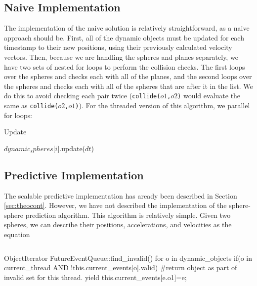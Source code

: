 \documentclass[conference]{IEEEtran}
\begin{document}
\subsection{Naive Implementation}

The implementation of the naive solution is relatively straightforward, as a naive approach should be.  First, all of the dynamic objects must be updated for each timestamp to their new positions, using their previously calculated velocity vectors.  Then, because we are handling the spheres and planes separately, we have two sets of nested for loops to perform the collision checks.  The first loops over the spheres and checks each with all of the planes, and the second loops over the spheres and checks each with all of the spheres that are after it in the list.  We do this to avoid checking each pair twice (\texttt{collide($o1$,$o2$)} would evaluate the same as \texttt{collide($o2$,$o1$)}). For the threaded version of this algorithm, we parallel for loops:

\begin{algorithm}
\caption{Update}
\begin{algorithmic}
	\STATE $dynamic_spheres$[$i$].update($dt$)
\ENDFOR
\end{algorithmic}
\end{algorithm}

\subsection{Predictive Implementation}

The scalable predictive implementation has aready been described in Section \ref{sec:theocont}.  However, we have not described the implementation of the sphere-sphere prediction algorithm.
This algorithm is relatively simple.  Given two spheres, we can describe their positions, accelerations, and velocities as the equation

\begin{equation}
\end{equation}
   
\begin{verbatimtab}[3]
ObjectIterator FutureEventQueue::find_invalid()
{
   for o in dynamic_objects
   {
      if(o in current_thread AND !this.current_events[o].valid)
      #return object as part of invalid set for this thread.
	yield this.current_events[e.o1]=e;
   }
}
\end{verbatimtab}
\end{document}
